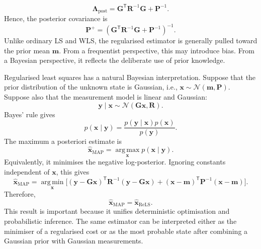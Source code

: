 \begin{equation}
\mathbf{\Lambda}_{\mathrm{post}}
=
\mathbf{G}^{\mathsf T}
\mathbf{R}^{-1}
\mathbf{G}
+
\mathbf{P}^{-1}.
\end{equation}
Hence, the posterior covariance is
\begin{equation}
\mathbf{P}^{+}
=
\left(
\mathbf{G}^{\mathsf T}
\mathbf{R}^{-1}
\mathbf{G}
+
\mathbf{P}^{-1}
\right)^{-1}.
\end{equation}
Unlike ordinary LS and WLS, the regularised estimator is generally pulled toward the prior mean $\mathbf{m}$. From a frequentist perspective, this may introduce bias. From a Bayesian perspective, it reflects the deliberate use of prior knowledge.

Regularised least squares has a natural Bayesian interpretation. Suppose that the prior distribution of the unknown state is Gaussian, i.e., $\mathbf{x}
\sim
\mathcal{N}
\left(
\mathbf{m},
\mathbf{P}
\right)$. Suppose also that the measurement model is linear and Gaussian:
\begin{equation}
\mathbf{y}\mid\mathbf{x}
\sim
\mathcal{N}
\left(
\mathbf{G}\mathbf{x},
\mathbf{R}
\right).
\end{equation}
Bayes' rule gives
\begin{equation}
p(\mathbf{x}\mid\mathbf{y})
=
\frac{
p(\mathbf{y}\mid\mathbf{x})p(\mathbf{x})
}{
p(\mathbf{y})
}.
\end{equation}
The maximum a posteriori estimate is
\begin{equation}
\widehat{\mathbf{x}}_{\mathrm{MAP}}
=
\operatorname*{arg\,max}_{\mathbf{x}}
p(\mathbf{x}\mid\mathbf{y}).
\end{equation}
Equivalently, it minimises the negative log-posterior. Ignoring constants independent of $\mathbf{x}$, this gives
\begin{equation}
\widehat{\mathbf{x}}_{\mathrm{MAP}} = \operatorname*{arg\,min}_{\mathbf{x}} \bigg[ \left( \mathbf{y} - \mathbf{G}\mathbf{x} \right)^{\mathsf T} \mathbf{R}^{-1} \left( \mathbf{y} - \mathbf{G}\mathbf{x} \right) + \left( \mathbf{x} - \mathbf{m} \right)^{\mathsf T} \mathbf{P}^{-1} \left( \mathbf{x} - \mathbf{m} \right) \bigg].
\end{equation}
Therefore,
\begin{equation}
\widehat{\mathbf{x}}_{\mathrm{MAP}}
=
\widehat{\mathbf{x}}_{\mathrm{ReLS}}.
\end{equation}
This result is important because it unifies deterministic optimisation and probabilistic inference. The same estimator can be interpreted either as the minimiser of a regularised cost or as the most probable state after combining a Gaussian prior with Gaussian measurements.

